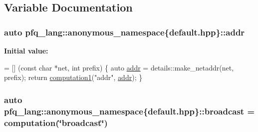 \subsection{Variable Documentation}
\hypertarget{namespacepfq__lang_1_1anonymous__namespace_02default_8hpp_03_aafce8334d1be83bff9a2115439c8c453}{
\subsubsection[{addr}]{\setlength{\rightskip}{0pt plus 5cm}auto pfq\-\_\-lang\-::anonymous\-\_\-namespace\{default.\-hpp\}\-::addr}}\label{namespacepfq__lang_1_1anonymous__namespace_02default_8hpp_03_aafce8334d1be83bff9a2115439c8c453}
{\bfseries Initial value\-:}
\begin{DoxyCode}
= [] (\textcolor{keyword}{const} \textcolor{keywordtype}{char} *net, \textcolor{keywordtype}{int} prefix)
        \{
            \textcolor{keyword}{auto} \hyperlink{namespacepfq__lang_1_1anonymous__namespace_02default_8hpp_03_aafce8334d1be83bff9a2115439c8c453}{addr} = details::make\_netaddr(net, prefix);
            \textcolor{keywordflow}{return} \hyperlink{namespacepfq__lang_a58e7e358fc7c95121f74d56c094b1627}{computation1}(\textcolor{stringliteral}{"addr"}, \hyperlink{namespacepfq__lang_1_1anonymous__namespace_02default_8hpp_03_aafce8334d1be83bff9a2115439c8c453}{addr});
        \}
\end{DoxyCode}
\hypertarget{namespacepfq__lang_1_1anonymous__namespace_02default_8hpp_03_a3b7dd001dfb2302c93212313c0bfa82a}{
\subsubsection[{broadcast}]{\setlength{\rightskip}{0pt plus 5cm}auto pfq\-\_\-lang\-::anonymous\-\_\-namespace\{default.\-hpp\}\-::broadcast = {\bf computation}(\char`\"{}broadcast\char`\"{})}}\label{namespacepfq__lang_1_1anonymous__namespace_02default_8hpp_03_a3b7dd001dfb2302c93212313c0bfa82a}
